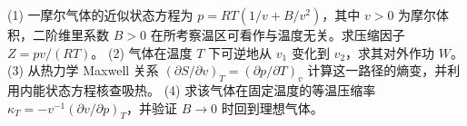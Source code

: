 (1) 一摩尔气体的近似状态方程为 \(p=RT(1/v+B/v^2)\)，其中 \(v>0\) 为摩尔体积，二阶维里系数 \(B>0\) 在所考察温区可看作与温度无关。求压缩因子 \(Z=pv/(RT)\)。
(2) 气体在温度 \(T\) 下可逆地从 \(v_1\) 变化到 \(v_2\)，求其对外作功 \(W\)。
(3) 从热力学 Maxwell 关系 \(\left(\partial S/\partial v\right)_T=(\partial p/\partial T)_v\) 计算这一路径的熵变，并利用内能状态方程核查吸热。
(4) 求该气体在固定温度的等温压缩率 \(\kappa_T=-v^{-1}(\partial v/\partial p)_T\)，并验证 \(B\to0\) 时回到理想气体。
